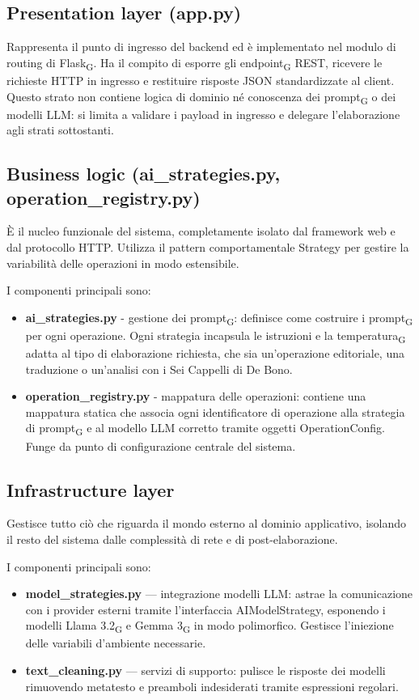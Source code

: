 \documentclass[11pt,a4paper]{article}
\newcommand{\gls}[1]{#1\textsubscript{G}}
\begin{document}
\subsection{Presentation layer (app.py)}
Rappresenta il punto di ingresso del backend ed è implementato nel modulo di routing di \gls{Flask}. Ha il compito di esporre gli \gls{endpoint} REST, ricevere le richieste HTTP in ingresso e restituire risposte JSON standardizzate al client. Questo strato non contiene logica di dominio né conoscenza dei \gls{prompt} o dei modelli LLM: si limita a validare i payload in ingresso e delegare l'elaborazione agli strati sottostanti.

\subsection{Business logic (ai\_strategies.py, operation\_registry.py)}
È il nucleo funzionale del sistema, completamente isolato dal framework web e dal protocollo HTTP. Utilizza il pattern comportamentale Strategy per gestire la variabilità delle operazioni in modo estensibile.

I componenti principali sono:
\begin{itemize}
\item \textbf{ai\_strategies.py} - gestione dei \gls{prompt}: definisce come costruire i \gls{prompt} per ogni operazione. Ogni strategia incapsula le istruzioni e la \gls{temperatura} adatta al tipo di elaborazione richiesta, che sia un'operazione editoriale, una traduzione o un'analisi con i Sei Cappelli di De Bono.
\item \textbf{operation\_registry.py} - mappatura delle operazioni: contiene una mappatura statica che associa ogni identificatore di operazione alla strategia di \gls{prompt} e al modello LLM corretto tramite oggetti OperationConfig. Funge da punto di configurazione centrale del sistema.
\end{itemize}

\subsection{Infrastructure layer}
Gestisce tutto ciò che riguarda il mondo esterno al dominio applicativo, isolando il resto del sistema dalle complessità di rete e di post-elaborazione.

I componenti principali sono:
\begin{itemize}
\item \textbf{model\_strategies.py} — integrazione modelli LLM: astrae la comunicazione con i provider esterni tramite l'interfaccia AIModelStrategy, esponendo i modelli \gls{Llama 3.2} e \gls{Gemma 3} in modo polimorfico. Gestisce l'iniezione delle variabili d'ambiente necessarie.
\item \textbf{text\_cleaning.py} — servizi di supporto: pulisce le risposte dei modelli rimuovendo metatesto e preamboli indesiderati tramite espressioni regolari.
\end{itemize}
\end{document}
